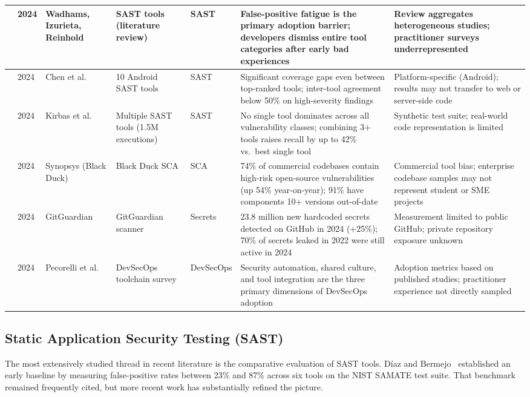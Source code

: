 \documentclass[12pt,a4paper]{report}
\begin{document}
\begin{longtable}{|p{0.4cm}|p{0.8cm}|p{2.4cm}|p{2.3cm}|p{1.5cm}|p{3.5cm}|p{3.2cm}|}
\hline
\cite{wadhams2024} & 2024 & Wadhams, Izurieta, Reinhold & SAST tools (literature review) & SAST & False-positive fatigue is the primary adoption barrier; developers dismiss entire tool categories after early bad experiences & Review aggregates heterogeneous studies; practitioner surveys underrepresented \\
\hline
\cite{chen2024android} & 2024 & Chen et al. & 10 Android SAST tools & SAST & Significant coverage gaps even between top-ranked tools; inter-tool agreement below 50\% on high-severity findings & Platform-specific (Android); results may not transfer to web or server-side code \\
\hline
\cite{kirbas2024} & 2024 & Kirbas et al. & Multiple SAST tools (1.5M executions) & SAST & No single tool dominates across all vulnerability classes; combining 3+ tools raises recall by up to 42\% vs.\ best single tool & Synthetic test suite; real-world code representation is limited \\
\hline
\cite{synopsys2024} & 2024 & Synopsys (Black Duck) & Black Duck SCA & SCA & 74\% of commercial codebases contain high-risk open-source vulnerabilities (up 54\% year-on-year); 91\% have components 10+ versions out-of-date & Commercial tool bias; enterprise codebase samples may not represent student or SME projects \\
\hline
\cite{gitguardian2024} & 2024 & GitGuardian & GitGuardian scanner & Secrets & 23.8 million new hardcoded secrets detected on GitHub in 2024 (+25\%); 70\% of secrets leaked in 2022 were still active in 2024 & Measurement limited to public GitHub; private repository exposure unknown \\
\hline
\cite{pecorelli2024} & 2024 & Pecorelli et al. & DevSecOps toolchain survey & DevSecOps & Security automation, shared culture, and tool integration are the three primary dimensions of DevSecOps adoption & Adoption metrics based on published studies; practitioner experience not directly sampled \\
\hline
\end{longtable}

\subsection{Static Application Security Testing (SAST)}

The most extensively studied thread in recent literature is the comparative evaluation of SAST tools. D\'iaz and Bermejo~\cite{diaz2013} established an early baseline by measuring false-positive rates between 23\% and 87\% across six tools on the NIST SAMATE test suite. That benchmark remained frequently cited, but more recent work has substantially refined the picture.
\end{document}
